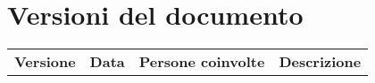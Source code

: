 \section{Versioni del documento}

\begin{center}

  \begin{table}[h]
    \centering
    \label{versioniDocumento}
    \begin{tabular}{ >{\centering}p{1.8cm} | >{\centering}p{2.2cm} | >{\centering}p{3cm} | >{\centering}p{6cm} }
      \hline
      \textbf{Versione} & \textbf{Data} & \textbf{Persone coinvolte} & \textbf{Descrizione} \\
    \end{tabular}
  \end{table}
  
\end{center}